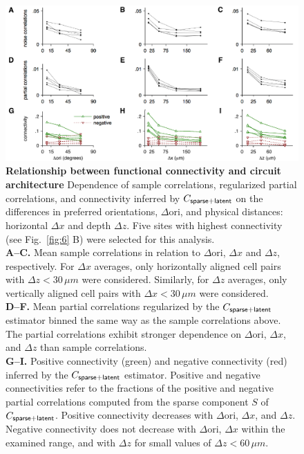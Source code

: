 \begin{figure}
\begin{fullpage}
        \begin{center}
        \includegraphics[width=\textwidth]{./figures/Figure7.pdf}
        \end{center}
        
\caption[Relationship between functional connectivity and circuit architecture]{
{\bf Relationship between functional connectivity and circuit architecture}
Dependence of sample correlations, regularized partial correlations, and connectivity inferred by $C_{\sf sparse+latent}$ on the differences in preferred orientations, $\Delta \mbox{ori}$, and physical distances: horizontal $\Delta x$ and depth $\Delta z$.
Five sites with highest connectivity (see Fig.~\ref{fig:6} B) were selected for this analysis.
\\
{\bf A--C.} Mean sample correlations in relation to $\Delta\mbox{ori}$,  $\Delta x$ and $\Delta z$, respectively. For $\Delta x$ averages, only horizontally aligned cell pairs with $\Delta z<30\,\mu m$ were considered. Similarly, for $\Delta z$ averages, only vertically aligned cell pairs with $\Delta x<30\,\mu m$ were considered.
\\
{\bf D--F.} Mean partial correlations regularized by the $C_{\sf sparse+latent}$ estimator binned the same way as the sample correlations above. The partial correlations exhibit stronger dependence on $\Delta\mbox{ori}$, $\Delta x$, and $\Delta z$ than sample correlations. 
\\
{\bf G--I.} Positive connectivity (green) and negative connectivity (red) inferred by the $C_{\sf sparse+latent}$ estimator. 
Positive and negative connectivities refer to the fractions of the positive and negative partial correlations computed from the sparse component $S$ of $C_{\sf sparse+latent}$.  
Positive connectivity decreases with $\Delta \mbox{ori}$, $\Delta x$, and $\Delta z$. 
Negative connectivity does not decrease with $\Delta \mbox{ori}$, $\Delta x$ within the examined range, and with $\Delta z$ for small values of $\Delta z<60\,\mu m$.
}\label{fig:7}

\end{fullpage}
\end{figure}
